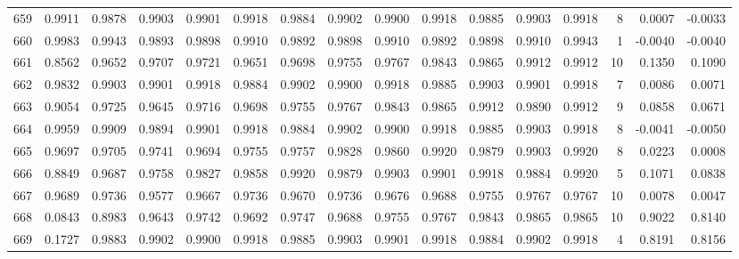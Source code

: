 \begin{tabular}{lrrrrrrrrrrrrrrr}
659 &      0.9911 &  0.9878 &  0.9903 &  0.9901 &  0.9918 &  0.9884 &  0.9902 &  0.9900 &  0.9918 &  0.9885 &   0.9903 &     0.9918 &      8 &                    0.0007 &                    -0.0033 \\
660 &      0.9983 &  0.9943 &  0.9893 &  0.9898 &  0.9910 &  0.9892 &  0.9898 &  0.9910 &  0.9892 &  0.9898 &   0.9910 &     0.9943 &      1 &                   -0.0040 &                    -0.0040 \\
661 &      0.8562 &  0.9652 &  0.9707 &  0.9721 &  0.9651 &  0.9698 &  0.9755 &  0.9767 &  0.9843 &  0.9865 &   0.9912 &     0.9912 &     10 &                    0.1350 &                     0.1090 \\
662 &      0.9832 &  0.9903 &  0.9901 &  0.9918 &  0.9884 &  0.9902 &  0.9900 &  0.9918 &  0.9885 &  0.9903 &   0.9901 &     0.9918 &      7 &                    0.0086 &                     0.0071 \\
663 &      0.9054 &  0.9725 &  0.9645 &  0.9716 &  0.9698 &  0.9755 &  0.9767 &  0.9843 &  0.9865 &  0.9912 &   0.9890 &     0.9912 &      9 &                    0.0858 &                     0.0671 \\
664 &      0.9959 &  0.9909 &  0.9894 &  0.9901 &  0.9918 &  0.9884 &  0.9902 &  0.9900 &  0.9918 &  0.9885 &   0.9903 &     0.9918 &      8 &                   -0.0041 &                    -0.0050 \\
665 &      0.9697 &  0.9705 &  0.9741 &  0.9694 &  0.9755 &  0.9757 &  0.9828 &  0.9860 &  0.9920 &  0.9879 &   0.9903 &     0.9920 &      8 &                    0.0223 &                     0.0008 \\
666 &      0.8849 &  0.9687 &  0.9758 &  0.9827 &  0.9858 &  0.9920 &  0.9879 &  0.9903 &  0.9901 &  0.9918 &   0.9884 &     0.9920 &      5 &                    0.1071 &                     0.0838 \\
667 &      0.9689 &  0.9736 &  0.9577 &  0.9667 &  0.9736 &  0.9670 &  0.9736 &  0.9676 &  0.9688 &  0.9755 &   0.9767 &     0.9767 &     10 &                    0.0078 &                     0.0047 \\
668 &      0.0843 &  0.8983 &  0.9643 &  0.9742 &  0.9692 &  0.9747 &  0.9688 &  0.9755 &  0.9767 &  0.9843 &   0.9865 &     0.9865 &     10 &                    0.9022 &                     0.8140 \\
669 &      0.1727 &  0.9883 &  0.9902 &  0.9900 &  0.9918 &  0.9885 &  0.9903 &  0.9901 &  0.9918 &  0.9884 &   0.9902 &     0.9918 &      4 &                    0.8191 &                     0.8156 \\

\end{tabular}
